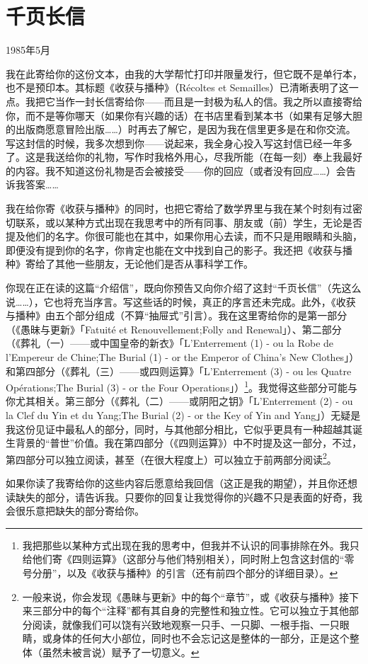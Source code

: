 \section{千页长信}

1985年5月

我在此寄给你的这份文本，由我的大学帮忙打印并限量发行，但它既不是单行本，也不是预印本。其标题《收获与播种》（Récoltes et Semailles）已清晰表明了这一点。我把它当作一封长信寄给你——而且是一封极为私人的信。我之所以直接寄给你，而不是等你哪天（如果你有兴趣的话）在书店里看到某本书（如果有足够大胆的出版商愿意冒险出版……）时再去了解它，是因为我在信里更多是在和你交流。写这封信的时候，我多次想到你——说起来，我全身心投入写这封信已经一年多了。这是我送给你的礼物，写作时我格外用心，尽我所能（在每一刻）奉上我最好的内容。我不知道这份礼物是否会被接受——你的回应（或者没有回应……）会告诉我答案……

我在给你寄《收获与播种》的同时，也把它寄给了数学界里与我在某个时刻有过密切联系，或以某种方式出现在我思考中的所有同事、朋友或（前）学生，无论是否提及他们的名字。你很可能也在其中，如果你用心去读，而不只是用眼睛和头脑，即便没有提到你的名字，你肯定也能在文中找到自己的影子。我还把《收获与播种》寄给了其他一些朋友，无论他们是否从事科学工作。

你现在正在读的这篇“介绍信”，既向你预告又向你介绍了这封“千页长信”（先这么说……），它也将充当序言。写这些话的时候，真正的序言还未完成。此外，《收获与播种》由五个部分组成（不算“抽屉式”引言）。我在这里寄给你的是第一部分（《愚昧与更新》「Fatuité et Renouvellement;Folly and Renewal」）、第二部分（《葬礼（一）——或中国皇帝的新衣》「L'Enterrement (1) - ou la Robe de l'Empereur de Chine;The Burial (1) - or the Emperor of China's New Clothes」）和第四部分（《葬礼（三）——或四则运算》「L'Enterrement (3) - ou les Quatre Opérations;The Burial (3) - or the Four Operations」）\footnote{我把那些以某种方式出现在我的思考中，但我并不认识的同事排除在外。我只给他们寄《四则运算》（这部分与他们特别相关），同时附上包含这封信的“零号分册”，以及《收获与播种》的引言（还有前四个部分的详细目录）。}。我觉得这些部分可能与你尤其相关。第三部分（《葬礼（二）——或阴阳之钥》「L'Enterrement (2) - ou la Clef du Yin et du Yang;The Burial (2) - or the Key of Yin and Yang」）无疑是我这份见证中最私人的部分，同时，与其他部分相比，它似乎更具有一种超越其诞生背景的“普世”价值。我在第四部分（《四则运算》）中不时提及这一部分，不过，第四部分可以独立阅读，甚至（在很大程度上）可以独立于前两部分阅读\footnote{一般来说，你会发现《愚昧与更新》中的每个“章节”，或《收获与播种》接下来三部分中的每个“注释”都有其自身的完整性和独立性。它可以独立于其他部分阅读，就像我们可以饶有兴致地观察一只手、一只脚、一根手指、一只眼睛，或身体的任何大小部位，同时也不会忘记这是整体的一部分，正是这个整体（虽然未被言说）赋予了一切意义。}。

如果你读了我寄给你的这些内容后愿意给我回信（这正是我的期望），并且你还想读缺失的部分，请告诉我。只要你的回复让我觉得你的兴趣不只是表面的好奇，我会很乐意把缺失的部分寄给你。